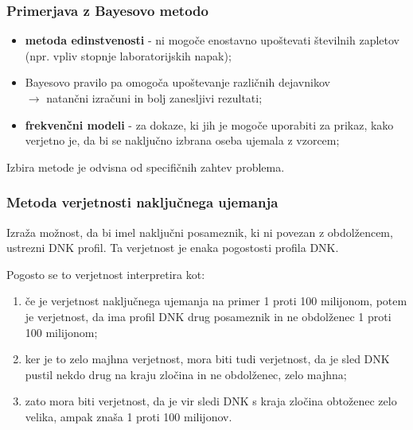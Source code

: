 \documentclass{beamer}
\begin{document}
\begin{frame}
    \frametitle{Primerjava z Bayesovo metodo}
    \begin{itemize}
        \item \textbf{metoda edinstvenosti} - ni mogoče enostavno upoštevati številnih zapletov (npr. vpliv stopnje laboratorijskih napak);
        \item Bayesovo pravilo pa omogoča upoštevanje različnih dejavnikov\\ $\rightarrow$ natančni izračuni in bolj zanesljivi rezultati;
        \item \textbf{frekvenčni modeli} - za dokaze, ki jih je mogoče uporabiti za prikaz, kako verjetno je, da bi se naključno izbrana oseba ujemala z vzorcem;
    \end{itemize} \vspace{3mm}
    \begin{block}{}
        \centering
        Izbira metode je odvisna od specifičnih zahtev problema.
    \end{block}
\end{frame}

\begin{frame}
    \frametitle{Metoda verjetnosti naključnega ujemanja}
    \begin{block}{}
        Izraža možnost, da bi imel naključni posameznik, ki ni povezan z obdolžencem, ustrezni DNK profil. Ta verjetnost je enaka pogostosti profila DNK. 
    \end{block}\vspace{2mm}
    Pogosto se to verjetnost interpretira kot:
    \begin{enumerate}
        \item če je verjetnost naključnega ujemanja na primer 1 proti 100 milijonom, potem je verjetnost, da ima profil DNK drug posameznik in ne
        obdolženec 1 proti 100 milijonom;
        \item ker je to zelo majhna verjetnost, mora biti tudi verjetnost, da je sled DNK pustil nekdo drug na kraju zločina in ne obdolženec, zelo majhna;
        \item zato mora biti verjetnost, da je vir sledi DNK s kraja zločina obtoženec zelo velika, ampak znaša 1 proti 100 milijonov.
    \end{enumerate}
\end{frame}
\end{document}

